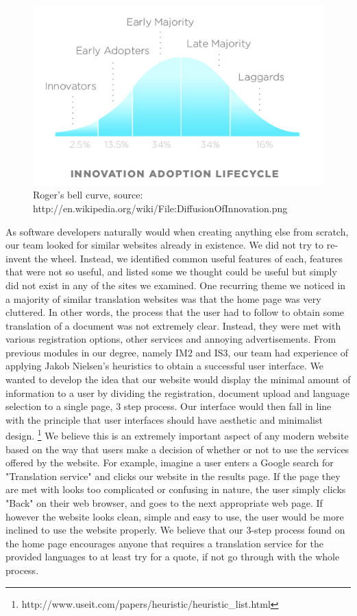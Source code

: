 \documentclass{article}
\begin{document}
\begin{figure}
\begin{center}
\includegraphics[scale=0.6]{DiffusionOfInnovation}
\caption{Roger's bell curve, source: http://en.wikipedia.org/wiki/File:DiffusionOfInnovation.png}
\end{center}
\end{figure}

As software developers naturally would when creating anything else from scratch, our team looked for similar websites already in existence. We did not try to re-invent the wheel. Instead, we identified common useful features of each, features that were not so useful, and listed some we thought could be useful but simply did not exist in any of the sites we examined. One recurring theme we noticed in a majority of similar translation websites was that the home page was very cluttered. In other words, the process that the user had to follow to obtain some translation of a document was not extremely clear. Instead, they were met with various registration options, other services and annoying advertisements. From previous modules in our degree, namely IM2 and IS3, our team had experience of applying Jakob Nielsen's heuristics to obtain a successful user interface. We wanted to develop the idea that our website would display the minimal amount of information to a user by dividing the registration, document upload and language selection to a single page, 3 step process. Our interface would then fall in line with the principle that user interfaces should have aesthetic and minimalist design. \footnote{http://www.useit.com/papers/heuristic/heuristic\_list.html} We believe this is an extremely important aspect of any modern website based on the way that users make a decision of whether or not to use the services offered by the website. For example, imagine a user enters a Google search for "Translation service" and clicks our website in the results page. If the page they are met with looks too complicated or confusing in nature, the user simply clicks "Back" on their web browser, and goes to the next appropriate web page. If however the website looks clean, simple and easy to use, the user would be more inclined to use the website properly. We believe that our 3-step process found on the home page encourages anyone that requires a translation service for the provided languages to at least try for a quote, if not go through with the whole process.	
\end{document}
